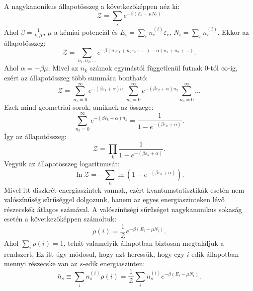 \documentclass[../main.tex]{subfiles}
\begin{document}
A nagykanonikus állapotösszeg a következőképpen néz ki:
\begin{equation}
    \mathcal{Z} = \sum_i e^{- \beta (E_i - \mu N_i)}
\end{equation}
Ahol $\beta = \frac{1}{k_B T}$, $\mu$ a kémiai potenciál és $E_i = \sum_r n^{(i)}_r \varepsilon_r$, $N_i = \sum_r n^{(i)}_r$. Ekkor az állapotösszeg:
\begin{equation}
    \mathcal{Z} = \sum_{n_1, n_2, \ldots} e^{-\beta (n_1 \varepsilon_1 + n_2 \varepsilon_2 + \ldots) - \alpha(n_1 + n_2 + \ldots)}.
\end{equation}
Ahol $\alpha = - \beta \mu$. Mivel az $n_k$ számok egymástól függetlenül futnak 0-tól $\infty$-ig, ezért az állapotösszeg több summára bontható:
\begin{equation}
    \mathcal{Z} = \sum_{n_1 = 0}^{\infty} e^{-(\beta \varepsilon_1 + \alpha)n_1} \sum_{n_2 = 0}^{\infty} e^{-(\beta \varepsilon_2 + \alpha)n_2} \sum_{n_3 = 0}^{\infty} \ldots
\end{equation}
Ezek mind geometriai sorok, amiknek az összege:
\begin{equation}
    \sum_{n_k = 0}^{\infty} e^{-(\beta \varepsilon_k + \alpha)n_k} = \frac{1}{1 - e^{-(\beta \varepsilon_k + \alpha)}}.
\end{equation}
Így az állapotösszeg:
\begin{equation}
    \mathcal{Z} = \prod_k \frac{1}{1 - e^{-(\beta \varepsilon_k + \alpha)}}.
\end{equation}
Vegyük az állapotösszeg logaritmusát:
\begin{equation}
    \ln \mathcal{Z} = - \sum_k \ln (1 - e^{-(\beta \varepsilon_k + \alpha)}).
\end{equation}
Mivel itt diszkrét energiaszintek vannak, ezért kvantumstatisztikák esetén nem valószínűség sűrűséggel dolgozunk, hanem az egyes energiaszinteken lévő részecskék átlagos számával. A valószínűségi sűrűséget nagykanonikus sokaság esetén a következőképpen számoltuk:
\begin{equation}
    \rho(i) = \frac{1}{\mathcal{Z}} e^{-\beta (E_i - \mu N_i)}.
\end{equation}
Ahol $\sum_i \rho(i) = 1$, tehát valamelyik állapotban biztosan megtaláljuk a rendszert. Ez itt úgy módosul, hogy azt heressük, hogy egy $i$-edik állapotban mennyi részecske van az $s$-edik energiaszinten:
\begin{equation}
    \bar{n}_s \equiv \sum_{i} n^{(i)}_s \rho(i) = \frac{1}{\mathcal{Z}} \sum_{i} n^{(i)}_s e^{-\beta (E_i - \mu N_i)}.
\end{equation}
\end{document}
